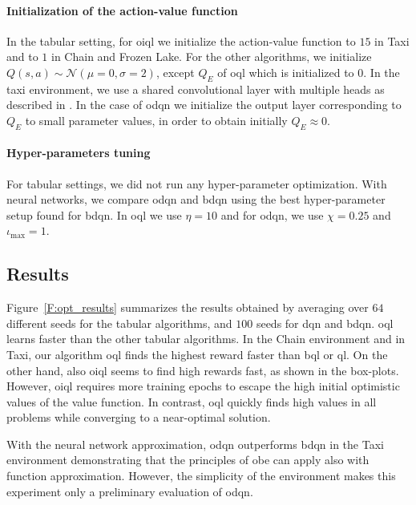 \paragraph{Initialization of the action-value function} In the tabular setting, for \gls{oiql} we initialize the action-value function to $15$ in Taxi and to $1$ in Chain and Frozen Lake. For the other algorithms, we initialize $Q(s,a) \sim \mathcal{N}(\mu=0,\sigma=2)$, except $Q_E$ of \gls{oql} which is initialized to $0$.
In the taxi environment, we use a shared convolutional layer with multiple heads as described in \cite{osband2017deep}. In the case of \gls{odqn} we initialize the output layer corresponding to $Q_E$ to small parameter values, in order to obtain initially $Q_E \approx 0$. 

\paragraph{Hyper-parameters tuning} For tabular settings, we did not run any hyper-parameter optimization. With neural networks, we compare \gls{odqn} and \gls{bdqn} using the best hyper-parameter setup found for \gls{bdqn}. In \gls{oql} we use $\eta=10$ and for \gls{odqn}, we use $\chi=0.25$ and $\iota_{\max}=1$.

% 	
\subsection{Results}
Figure~\ref{F:opt_results} summarizes the results obtained by averaging over $64$ different seeds for the tabular algorithms, and $100$ seeds for \gls{dqn} and \gls{bdqn}. \gls{oql} learns faster than the other tabular algorithms. In the Chain environment and in Taxi,
our algorithm \gls{oql} finds the highest reward faster than \gls{bql} or \gls{ql}. On the other hand, also \gls{oiql} seems to find
high rewards fast, as shown in the box-plots. However, \gls{oiql} requires more training epochs to escape the high initial
optimistic values of the value function. In contrast, \gls{oql} quickly finds high values in all problems while converging to a near-optimal solution.

With the neural network approximation, \gls{odqn} outperforms \gls{bdqn} in the Taxi environment demonstrating that the principles of \gls{obe} can apply also with function approximation. However, the simplicity of the environment makes this experiment only a preliminary evaluation of \gls{odqn}.
